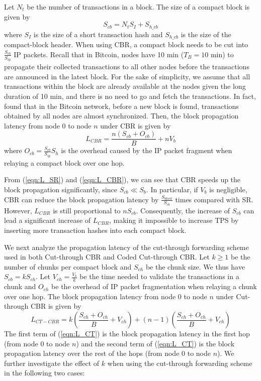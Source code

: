 \documentclass[10pt,journal,compsoc]{IEEEtran}
\begin{document}
Let ${N_t}$ be the number of transactions in a block. The size of a compact block is given by
\begin{equation}
	\label{eqn:Size_CBR}
	{S_{cb}} = {N_t}{S_I} + {S_{h\_cb}}
\end{equation}
where ${S_I}$ is the size of a short transaction hash and ${S_{h\_cb}}$ is the size of the compact-block header. When using CBR, a compact block needs to be cut into $\frac{{{S_{cb}}}}{{{S_{ip}}}}$ IP packets. Recall that in Bitcoin, nodes have 10 min (${T_B} = 10$ min) to propagate their collected transactions to all other nodes before the transactions are announced in the latest block. For the sake of simplicity, we assume that all transactions within the block are already available at the nodes given the long duration of 10 min, and there is no need to go and fetch the transactions. In fact, \cite{corallo2017compact} found that in the Bitcoin network, before a new block is found, transactions obtained by all nodes are almost synchronized. Then, the block propagation latency from node $0$ to node $n$ under CBR is given by
\begin{equation}
	\label{eqn:L_CBR}
	{L_{CBR}} = \frac{{n({S_{cb}} + {O_{cb}})}}{B} + n{V_b}
\end{equation}
where ${O_{cb}} = \frac{{{S_{cb}}}}{{{S_{ip}}}}{S_h}$ is the overhead caused by the IP packet fragment when relaying a compact block over one hop. 

From (\ref{eqn:L_SR}) and (\ref{eqn:L_CBR}), we can see that CBR speeds up the block propagation significantly, since ${S_{cb}} \ll {S_b}$. In particular, if ${V_b}$ is negligible, CBR can reduce the block propagation latency by $\frac{{{S_{block}}}}{{{S_{cb}}}}$ times compared with SR. However, ${L_{CBR}}$ is still proportional to $n{S_{cb}}$. Consequently, the increase of ${S_{cb}}$ can lead a significant increase of ${L_{CBR}}$, making it impossible to increase TPS by inserting more transaction hashes into each compact block.  

We next analyze the propagation latency of the cut-through forwarding scheme used in both Cut-through CBR and Coded Cut-through CBR. Let $k \ge 1$ be the number of chunks per compact block and ${S_{ch}}$ be the chunk size. We thus have ${S_{cb}} = k{S_{ch}}$. Let ${V_{ch}} = \frac{{{V_b}}}{k}$ be the time needed to validate the transactions in a chunk and ${O_{ch}}$ be the overhead of IP packet fragmentation when relaying a chunk over one hop. The block propagation latency from node $0$ to node $n$ under Cut-through CBR is given by
\begin{equation}
	\label{eqn:L_CT}
	{L_{CT - CBR}} = k(\frac{{{S_{ch}} + {O_{ch}}}}{B} + {V_{ch}}) + (n - 1)(\frac{{{S_{ch}} + {O_{ch}}}}{B} + {V_{ch}})
\end{equation}
The first term of (\ref{eqn:L_CT}) is the block propagation latency in the first hop (from node $0$ to node $n$) and the second term of (\ref{eqn:L_CT}) is the block propagation latency over the rest of the hops (from node $0$ to node $n$). We further investigate the effect of $k$ when using the cut-through forwarding scheme in the following two cases: 
\end{document}
